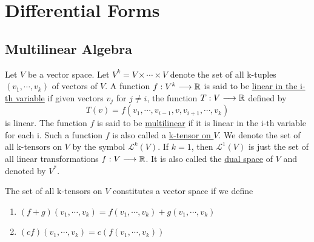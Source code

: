 \chapter{Differential Forms}

\section{Multilinear Algebra}

\begin{definition}
    Let $V$ be a vector space. Let $V^k=V\times \cdots \times V$ denote the set of all k-tuples $(v_1,\cdots,v_k)$ of vectors of $V$. A function $f:V^k\longrightarrow\mathbb{R}$ is said to be \underline{linear in the i-th variable} if given vectors $v_j$ for $j\neq i$, the function $T:V\longrightarrow \mathbb{R}$ defined by $$T(v)=f(v_1,\cdots,v_{i-1},v,v_{i+1},\cdots,v_k)$$ is linear. The function $f$ is said to be \underline{multilinear} if it is 
    linear in the i-th variable for each i. Such a function $f$ is also called a \underline{k-tensor on $V$}. We denote the set of all k-tensors on $V$ by the symbol $\mathcal{L}^k(V)$. If $k=1$, then $\mathcal{L}^1(V)$ is just the set of all linear transformations $f:V\longrightarrow\mathbb{R}$. It is also called the \underline{dual space} of $V$ and denoted by $V^*$.
\end{definition}

\begin{theorem}
    The set of all k-tensors on $V$ constitutes a vector space if we define 
    \begin{enumerate}
        \item $(f+g)(v_1,\cdots,v_k)=f(v_1,\cdots,v_k)+g(v_1,\cdots,v_k)$
        \item $(cf)(v_1,\cdots,v_k)=c(f(v_1,\cdots,v_k))$
    \end{enumerate}
\end{theorem}

